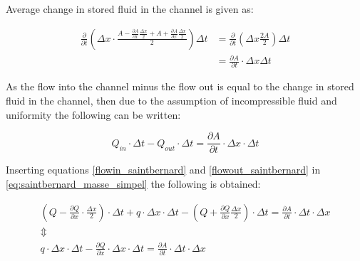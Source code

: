 Average change in stored fluid in the channel is given as:

\begin{equation}\label{stored_saintbernard}
\begin{aligned}
\frac{\partial}{\partial t} \left(\Delta x \cdot \frac{A- \frac{\partial A}{\partial x} \frac{\Delta x}{2} +A + \frac{\partial A}{\partial x} \frac{\Delta x}{2}}{2}  \right) \Delta t 
& = \frac{\partial}{\partial t} \left( \Delta x \frac{2A}{2} \right) \Delta t \\
& = \frac{\partial A}{\partial t} \cdot \Delta x	\Delta t
\end{aligned}
\end{equation}


As the flow into the channel minus the flow out is equal to the change in stored fluid in the channel, then due to the assumption of incompressible fluid and uniformity the following can be written:  

\begin{equation}\label{eq:saintbernard_masse_simpel}
	Q_{in}\cdot \Delta t - Q_{out}\cdot \Delta t = \frac{\partial A}{\partial t} \cdot \Delta x	\cdot \Delta t
\end{equation}

Inserting equations \ref{flowin_saintbernard} and \ref{flowout_saintbernard} in \ref{eq:saintbernard_masse_simpel} the following is obtained:

\begin{equation}
\begin{array}{l}
	\left(Q - \frac{\partial Q}{\partial x}\cdot \frac{\Delta x}{2}\right) \cdot \Delta t + q \cdot \Delta x \cdot \Delta t - \left(Q + \frac{\partial Q}{ \partial x} \frac{\Delta x}{2} \right) \cdot \Delta t  = \frac{\partial A}{\partial t}\cdot \Delta t 
	\cdot \Delta x \\ 
\Updownarrow \\
q \cdot \Delta x \cdot \Delta t  - \frac{\partial Q}{\partial x} \cdot \Delta x \cdot \Delta t  = \frac{\partial A}{\partial t} \cdot \Delta t 
	\cdot \Delta x 
\end{array}
\label{saintbernard_masse}
\end{equation}


